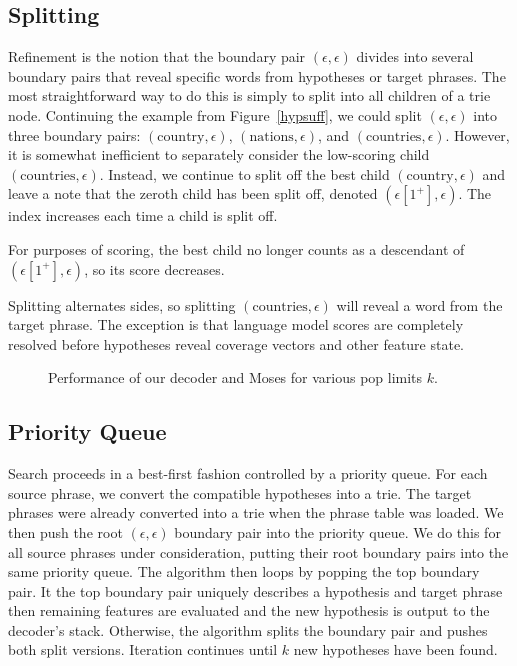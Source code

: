 \documentclass[11pt]{article}
\begin{document}
\subsection{Splitting}
Refinement is the notion that the boundary pair $(\epsilon, \epsilon)$ divides into several boundary pairs that reveal specific words from hypotheses or target phrases.  The most straightforward way to do this is simply to split into all children of a trie node.  Continuing the example from Figure~\ref{hypsuff}, we could split $(\epsilon, \epsilon)$ into three boundary pairs: $(\text{country}, \epsilon)$, $(\text{nations}, \epsilon)$, and $(\text{countries}, \epsilon)$.  However, it is somewhat inefficient to separately consider the low-scoring child $(\text{countries}, \epsilon)$.  Instead, we continue to split off the best child $(\text{country}, \epsilon)$ and leave a note that the zeroth child has been split off, denoted $(\epsilon[1^+], \epsilon)$.  The index increases each time a child is split off.  

For purposes of scoring, the best child no longer counts as a descendant of $(\epsilon[1^+], \epsilon)$, so its score decreases.    

Splitting alternates sides, so splitting $(\text{countries}, \epsilon)$ will reveal a word from the target phrase.  The exception is that language model scores are completely resolved before hypotheses reveal coverage vectors and other feature state.  

\begin{figure*}[t]%

\caption{\label{results}Performance of our decoder and Moses for various pop limits $k$.}
\end{figure*}

\subsection{Priority Queue}
Search proceeds in a best-first fashion controlled by a priority queue.  For each source phrase, we convert the compatible hypotheses into a trie.  The target phrases were already converted into a trie when the phrase table was loaded.  We then push the root $(\epsilon, \epsilon)$ boundary pair into the priority queue.  We do this for all source phrases under consideration, putting their root boundary pairs into the same priority queue.  The algorithm then loops by popping the top boundary pair.  It the top boundary pair uniquely describes a hypothesis and target phrase then remaining features are evaluated and the new hypothesis is output to the decoder's stack.  Otherwise, the algorithm splits the boundary pair and pushes both split versions.  Iteration continues until $k$ new hypotheses have been found.  
\end{document}
